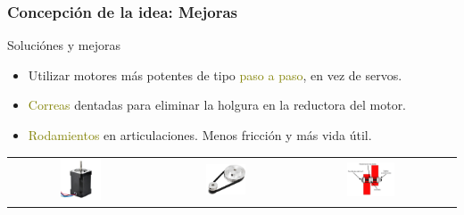 \documentclass{beamer}
\begin{document}
\begin{frame}
  \frametitle{Concepción de la idea: Mejoras}
  
  \begin{block}{Soluciónes y mejoras}
    \begin{itemize}
    \item Utilizar motores más potentes de tipo \textcolor{olive}{paso a paso}, en vez de servos.
    \item \textcolor{olive}{Correas} dentadas para eliminar la holgura en la reductora del motor.
    \item \textcolor{olive}{Rodamientos} en articulaciones. Menos fricción y más vida útil.
    \end{itemize}
  \end{block}
  \begin{tabular}{cccc}
    \includegraphics[width=0.3\textwidth, valign=m]{figs/nema1760.jpg} & \includegraphics[width=0.3\textwidth, valign=m]{figs/polea.png} 
    & \includegraphics[width=0.35\textwidth, valign=m]{figs/RodamientosBrida.png}
    
\end{tabular}
\end{frame}
\end{document}
